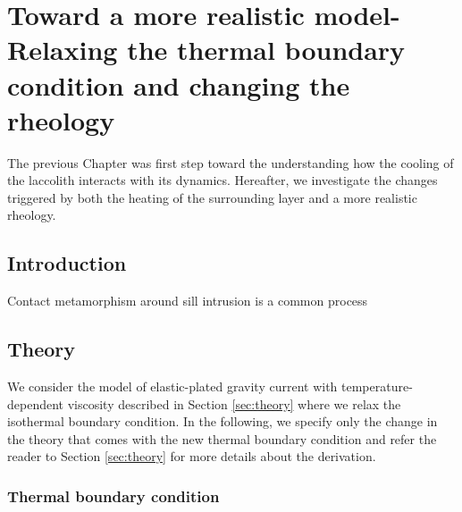
\chapter{Toward a more realistic model- Relaxing the thermal boundary
  condition and changing the rheology}
\label{Heating}

\minitoc
The previous Chapter  was first step toward the  understanding how the
cooling of the  laccolith interacts with its  dynamics.  Hereafter, we
investigate  the  changes  triggered  by   both  the  heating  of  the
surrounding layer and a more realistic rheology.

\section{Introduction}
\label{sec:introduction}
 
Contact metamorphism around sill intrusion is a common process

\citep{Everett:2008tn}

\section{Theory}
\label{sec:theory-1}

We  consider   the  model  of  elastic-plated   gravity  current  with
temperature-dependent viscosity described  in Section \ref{sec:theory}
where we relax the isothermal boundary condition. In the following, we
specify only the change in the  theory that comes with the new thermal
boundary condition  and refer  the reader to  Section \ref{sec:theory}
for more details about the derivation.

\subsection{Thermal boundary condition}
\label{sec:formulation-1}

